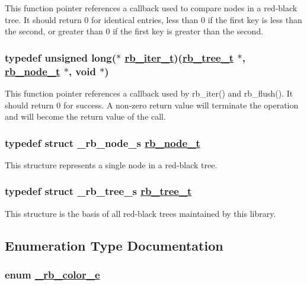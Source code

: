 This function pointer references a callback used to compare nodes in a red-black tree. It should return 0 for identical entries, less than 0 if the first key is less than the second, or greater than 0 if the first key is greater than the second. \hypertarget{group__dbprim__rbtree_a2}{
\subsubsection[rb\_\-iter\_\-t]{\setlength{\rightskip}{0pt plus 5cm}typedef unsigned long($\ast$ \hyperlink{dbprim_8h_a2}{rb\_\-iter\_\-t})(\hyperlink{dbprim_8h_a0}{rb\_\-tree\_\-t} $\ast$, \hyperlink{dbprim_8h_a1}{rb\_\-node\_\-t} $\ast$, void $\ast$)}}
\label{group__dbprim__rbtree_a2}


This function pointer references a callback used by rb\_\-iter() and rb\_\-flush(). It should return 0 for success. A non-zero return value will terminate the operation and will become the return value of the call. \hypertarget{group__dbprim__rbtree_a1}{
\subsubsection[rb\_\-node\_\-t]{\setlength{\rightskip}{0pt plus 5cm}typedef struct \_\-rb\_\-node\_\-s \hyperlink{dbprim_8h_a1}{rb\_\-node\_\-t}}}
\label{group__dbprim__rbtree_a1}


This structure represents a single node in a red-black tree. \hypertarget{group__dbprim__rbtree_a0}{
\subsubsection[rb\_\-tree\_\-t]{\setlength{\rightskip}{0pt plus 5cm}typedef struct \_\-rb\_\-tree\_\-s \hyperlink{dbprim_8h_a0}{rb\_\-tree\_\-t}}}
\label{group__dbprim__rbtree_a0}


This structure is the basis of all red-black trees maintained by this library. 

\subsection{Enumeration Type Documentation}
\hypertarget{group__dbprim__rbtree_a38}{
\subsubsection[\_\-rb\_\-color\_\-e]{\setlength{\rightskip}{0pt plus 5cm}enum \hyperlink{group__dbprim__rbtree_a38}{\_\-rb\_\-color\_\-e}}}
\label{group__dbprim__rbtree_a38}


